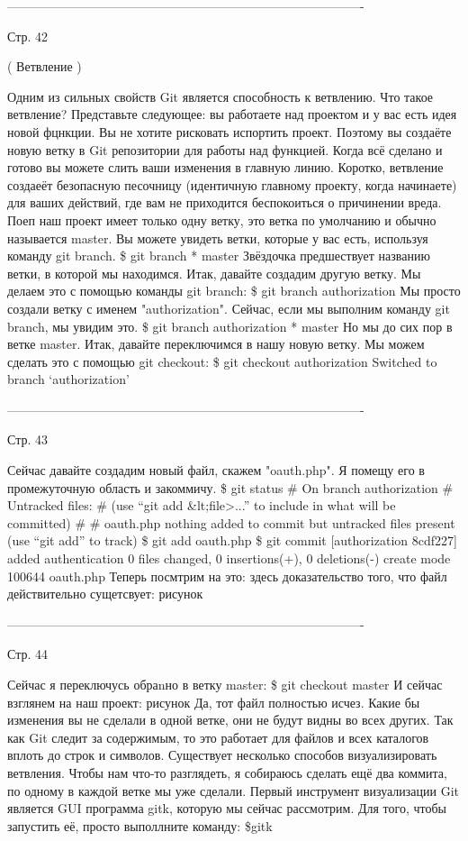 -------------------------------------------------------------------------------------

Стр. 42

( Ветвление )

Одним из сильных свойств Git является способность к ветвлению. Что такое ветвление?
Представьте следующее: вы работаете над проектом и у вас есть идея новой фцнкции.
Вы не хотите рисковать испортить проект. Поэтому вы создаёте новую ветку в Git
репозитории для работы над функцией. Когда всё сделано и готово вы можете слить ваши
изменения в главную линию. Коротко, ветвление создаеёт безопасную песочницу (идентичную
главному проекту, когда начинаете) для ваших действий, где вам не приходится беспокоиться
о причинении вреда.
Поеп наш проект имеет только одну ветку, это ветка по умолчанию и обычно называется
master. Вы можете увидеть ветки, которые у вас есть, используя команду git branch.
\$ git branch
* master
Звёздочка предшествует названию ветки, в которой мы находимся. Итак, давайте создадим
другую ветку. Мы делаем это с помощью команды git branch:
\$ git branch authorization
Мы просто создали ветку с именем "authorization". Сейчас, если мы выполним команду 
git branch, мы увидим это.
\$ git branch
authorization
* master
Но мы до сих пор в ветке master. Итак, давайте переключимся в нашу новую ветку. Мы
можем сделать это с помощью git checkout:
\$ git checkout authorization
Switched to branch ‘authorization’

-------------------------------------------------------------------------------------

Стр. 43

Сейчас давайте создадим новый файл, скажем "oauth.php". Я помещу его в промежуточную
область и закоммичу.
\$ git status
# On branch authorization
# Untracked files:
#
(use “git add &lt;file>...” to include in what will be
committed)
#
#       
oauth.php
nothing added to commit but untracked files present (use
“git add” to track)
\$ git add oauth.php
\$ git commit
[authorization 8cdf227] added authentication
0 files changed, 0 insertions(+), 0 deletions(-)
create mode 100644 oauth.php
Теперь посмтрим на это: здесь доказательство того, что файл действительно сущетсвует:
{рисунок}

-------------------------------------------------------------------------------------

Стр. 44

Сейчас я переключусь обраnно в  ветку master:
\$ git checkout master
И сейчас взглянем на наш проект:
{рисунок}
Да, тот файл полностью исчез. Какие бы изменения вы не сделали в одной ветке, они не 
будут видны во всех других. Так как Git следит за содержимым, то это работает для
файлов и всех каталогов вплоть до строк и символов.
Существует несколько способов визуализировать ветвления. Чтобы нам что-то разглядеть,
я собираюсь сделать ещё два коммита, по одному в каждой ветке мы уже сделали.
Первый инструмент визуализации Git является GUI программа gitk, которую мы сейчас
рассмотрим. Для того, чтобы запустить её, просто выполлните команду:
\$gitk

